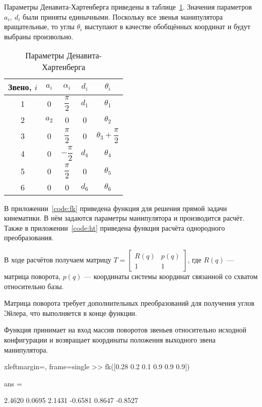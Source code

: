 \documentclass[14pt]{extarticle}
\begin{document}
    Параметры Денавита-Хартенберга приведены в таблице~\ref{tbl:params}.
    Значения параметров $a_i,\ d_i$ были приняты единычными. Поскольку все звенья манипулятора
    вращательные, то углы $\theta_i$ выступают в качестве обобщённых координат и будут выбраны произвольно.
    {
    \renewcommand{\arraystretch}{2}
    \begin{table}[H]
        \centering
        \begin{tabular}{*{5}{c}}\toprule
            Звено, $i$  & $a_i$ & $\alpha_i$        & $d_i$ & $\theta_i$ \\ [1ex] \midrule
            1           & 0     & $\dfrac{\pi}{2}$  & $d_1$ & $\theta_1$ \\ [1ex] \midrule
            2           & $a_2$ & 0                 & 0     & $\theta_2$ \\ [1ex] \midrule
            3           & 0     & $\dfrac{\pi}{2}$  & 0     & $\theta_3 + \dfrac{\pi}{2}$ \\ [1ex] \midrule
            4           & 0     & $-\dfrac{\pi}{2}$ & $d_4$ & $\theta_4$ \\ [1ex] \midrule
            5           & 0     & $\dfrac{\pi}{2}$  & 0     & $\theta_5$ \\ [1ex] \midrule
            6           & 0     & 0                 & $d_6$ & $\theta_6$ \\ [1ex]
            \bottomrule
        \end{tabular}
        \caption{Параметры Денавита-Хартенберга}
        \label{tbl:params}
    \end{table}
    }

    В приложении~\ref{code:fk} приведена функция для решения прямой задачи кинематики. В нём задаются параметры
    манипулятора и производится расчёт. Также в приложении~\ref{code:ht} приведена функция расчёта однородного преобразования.

    В ходе расчётов получаем матрицу
    $T =
    \begin{bmatrix}
        R(q) & p(q)\\
        1 & 1
    \end{bmatrix}$,
    где $R(q)$ --- матрица поворота, $p(q)$ --- координаты системы координат связанной со схватом относительно базы.

    Матрица поворота требует дополнительных преобразований для получения углов Эйлера, что выполняется в конце функции.

    Функция принимает на вход массив поворотов звеньев относительно исходной конфигурации и возвращает
    координаты положения выходного звена манипулятора.
    \begin{matlabcode*}{xleftmargin=\parindent, frame=single}
        >> fk([0.28 0.2 0.1 0.9 0.9 0.9])

        ans =

            2.4620    0.0695    2.1431   -0.6581    0.8647   -0.8527
    \end{matlabcode*}
\end{document}
